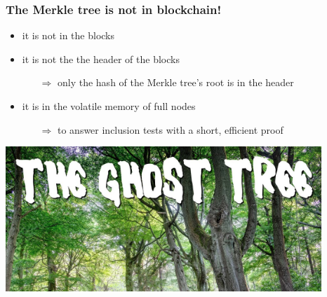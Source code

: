 \documentclass[11pt]{beamer}  %
\begin{document}
\begin{frame}\frametitle{The Merkle tree is not in blockchain!}

  \begin{greenbox}{}
    \begin{itemize}
    \item it is not in the blocks
    \item it is not the the header of the blocks
      \begin{itemize}
      \item[$\Rightarrow$] only the hash of the Merkle tree's root is in the header
      \end{itemize}
    \item it is in the volatile memory of full nodes
      \begin{itemize}
      \item[$\Rightarrow$] to answer inclusion tests with a short, efficient proof
      \end{itemize}      
    \end{itemize}
  \end{greenbox}

  \bigskip

  \begin{center}
    \includegraphics[scale=0.5,clip=false]{pictures/ghost-tree.png}
  \end{center}

\end{frame}
\end{document}
